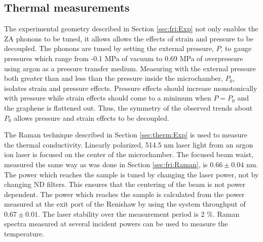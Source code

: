 \subsection{Thermal measurements}
The experimental geometry described in Section \ref{sec:fri:Exp} not only enables the ZA phonons to be tuned, it allows allows the effects of strain and pressure to be decoupled.
The phonons are tuned by setting the external pressure, $P$, to gauge pressures which range from -0.1 MPa of vacuum to 0.69 MPa of overpressure using argon as a pressure transfer medium.
Measuring with the external pressure both greater than and less than the pressure inside the microchamber, $P_0$, isolates strain and pressure effects.
Pressure effects should increase monotonically with pressure while strain effects should come to a minimum when $P=P_0$ and the graphene is flattened out.
Thus, the symmetry of the observed trends about $P_0$ allows pressure and strain effects to be decoupled.

The Raman technique described in Section \ref{sec:therm:Exp} is used to measure the thermal conductivity.
Linearly polarized, 514.5 nm laser light from an argon ion laser is focused on the center of the microchamber.
The focused beam waist, measured the same way as was done in Section \ref{sec:fri:Raman}, is $0.66 \pm 0.04$ nm.
The power which reaches the sample is tuned by changing the laser power, not by changing ND filters.
This ensures that the centering of the beam is not power dependent.
The power which reaches the sample is calculated from the power measured at the exit port of the Renishaw by using the system throughput of $0.67 \pm 0.01$.
The laser stability over the measurement period is 2 \%.
Raman spectra measured at several incident powers can be used to measure the temperature.

